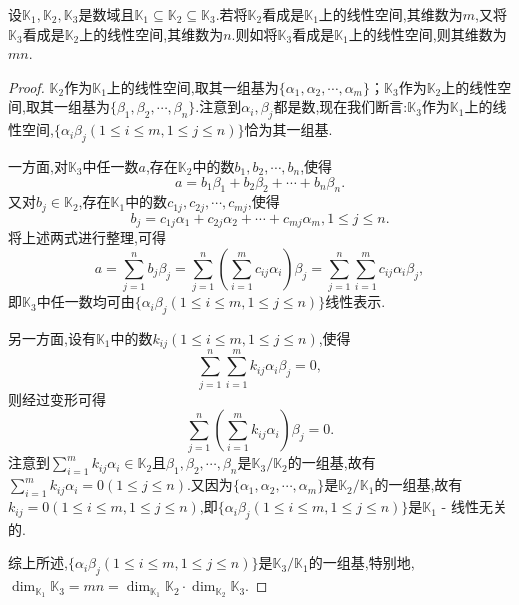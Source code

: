 \documentclass[lang=cn,newtx,10pt,scheme=chinese]{elegantbook}
\begin{document}
\begin{proposition}\label{proposition:数域上的线性空间的维数的传递性}
设\(\mathbb{K}_1,\mathbb{K}_2,\mathbb{K}_3\)是数域且\(\mathbb{K}_1\subseteq\mathbb{K}_2\subseteq\mathbb{K}_3\).若将\(\mathbb{K}_2\)看成是\(\mathbb{K}_1\)上的线性空间,其维数为\(m\),又将\(\mathbb{K}_3\)看成是\(\mathbb{K}_2\)上的线性空间,其维数为\(n\).则如将\(\mathbb{K}_3\)看成是\(\mathbb{K}_1\)上的线性空间,则其维数为\(mn\).
\end{proposition}
\begin{proof}
    \(\mathbb{K}_2\)作为\(\mathbb{K}_1\)上的线性空间,取其一组基为\(\{\alpha_1,\alpha_2,\cdots,\alpha_m\}\)；\(\mathbb{K}_3\)作为\(\mathbb{K}_2\)上的线性空间,取其一组基为\(\{\beta_1,\beta_2,\cdots,\beta_n\}\).注意到\(\alpha_i,\beta_j\)都是数,现在我们断言:\(\mathbb{K}_3\)作为\(\mathbb{K}_1\)上的线性空间,\(\{\alpha_i\beta_j(1\leq i\leq m,1\leq j\leq n)\}\)恰为其一组基.
    
    一方面,对\(\mathbb{K}_3\)中任一数\(a\),存在\(\mathbb{K}_2\)中的数\(b_1,b_2,\cdots,b_n\),使得
    \[
    a = b_1\beta_1 + b_2\beta_2+\cdots + b_n\beta_n.
    \]
    又对\(b_j\in\mathbb{K}_2\),存在\(\mathbb{K}_1\)中的数\(c_{1j},c_{2j},\cdots,c_{mj}\),使得
    \[
    b_j = c_{1j}\alpha_1 + c_{2j}\alpha_2+\cdots + c_{mj}\alpha_m,1\leq j\leq n.
    \]
    将上述两式进行整理,可得
    \[
    a=\sum_{j = 1}^{n}b_j\beta_j=\sum_{j = 1}^{n}\left(\sum_{i = 1}^{m}c_{ij}\alpha_i\right)\beta_j=\sum_{j = 1}^{n}\sum_{i = 1}^{m}c_{ij}\alpha_i\beta_j,
    \]
    即\(\mathbb{K}_3\)中任一数均可由\(\{\alpha_i\beta_j(1\leq i\leq m,1\leq j\leq n)\}\)线性表示.
    
    另一方面,设有\(\mathbb{K}_1\)中的数\(k_{ij}(1\leq i\leq m,1\leq j\leq n)\),使得
    \[
    \sum_{j = 1}^{n}\sum_{i = 1}^{m}k_{ij}\alpha_i\beta_j = 0,
    \]
    则经过变形可得
    \[
    \sum_{j = 1}^{n}\left(\sum_{i = 1}^{m}k_{ij}\alpha_i\right)\beta_j = 0.
    \]
    注意到\(\sum_{i = 1}^{m}k_{ij}\alpha_i\in\mathbb{K}_2\)且\(\beta_1,\beta_2,\cdots,\beta_n\)是\(\mathbb{K}_3/\mathbb{K}_2\)的一组基,故有\(\sum_{i = 1}^{m}k_{ij}\alpha_i = 0(1\leq j\leq n)\).又因为\(\{\alpha_1,\alpha_2,\cdots,\alpha_m\}\)是\(\mathbb{K}_2/\mathbb{K}_1\)的一组基,故有\(k_{ij}=0(1\leq i\leq m,1\leq j\leq n)\),即\(\{\alpha_i\beta_j(1\leq i\leq m,1\leq j\leq n)\}\)是\(\mathbb{K}_1\) - 线性无关的.
    
    综上所述,\(\{\alpha_i\beta_j(1\leq i\leq m,1\leq j\leq n)\}\)是\(\mathbb{K}_3/\mathbb{K}_1\)的一组基,特别地,\(\dim_{\mathbb{K}_1}\mathbb{K}_3=mn=\dim_{\mathbb{K}_1}\mathbb{K}_2\cdot\dim_{\mathbb{K}_2}\mathbb{K}_3\).
\end{proof}
\end{document}
